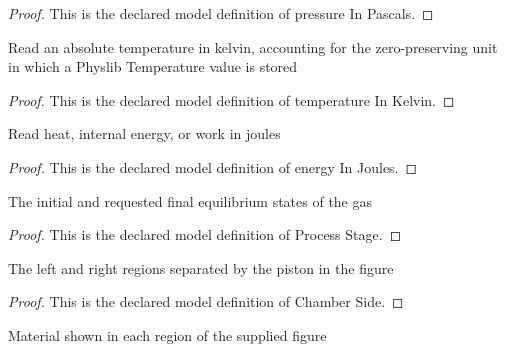 \begin{proof}
  This is the declared model definition of pressure In Pascals.
\end{proof}
\begin{definition}
  \label{def:physics:phyx-mini-0416:phyxminiproblems-problemphyxmini0416-temperatureinkelvin}
  Read an absolute temperature in kelvin, accounting for the zero-preserving unit in which a Physlib Temperature value is stored
\end{definition}
\begin{proof}
  This is the declared model definition of temperature In Kelvin.
\end{proof}
\begin{definition}
  \label{def:physics:phyx-mini-0416:phyxminiproblems-problemphyxmini0416-energyinjoules}
  Read heat, internal energy, or work in joules
\end{definition}
\begin{proof}
  This is the declared model definition of energy In Joules.
\end{proof}
\begin{definition}
  \label{def:physics:phyx-mini-0416:phyxminiproblems-problemphyxmini0416-processstage}
  The initial and requested final equilibrium states of the gas
\end{definition}
\begin{proof}
  This is the declared model definition of Process Stage.
\end{proof}
\begin{definition}
  \label{def:physics:phyx-mini-0416:phyxminiproblems-problemphyxmini0416-chamberside}
  The left and right regions separated by the piston in the figure
\end{definition}
\begin{proof}
  This is the declared model definition of Chamber Side.
\end{proof}
\begin{definition}
  \label{def:physics:phyx-mini-0416:phyxminiproblems-problemphyxmini0416-chambercontents}
  Material shown in each region of the supplied figure
\end{definition}
